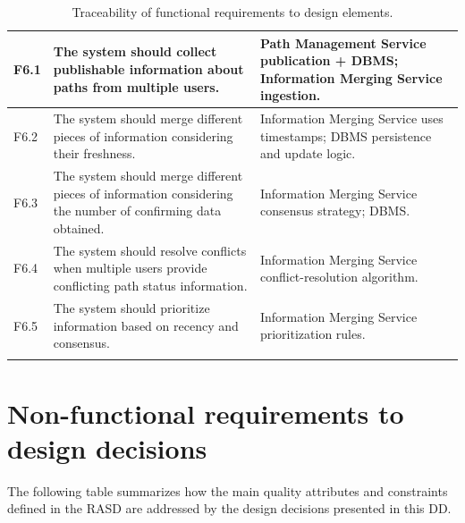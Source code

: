 \begin{longtable}{|p{}|p{}|p{}|}
    F6.1 & The system should collect publishable information about paths from multiple users. &
    Path Management Service publication + DBMS; Information Merging Service ingestion. \\
    \hline
    F6.2 & The system should merge different pieces of information considering their freshness. &
    Information Merging Service uses timestamps; DBMS persistence and update logic. \\
    \hline
    F6.3 & The system should merge different pieces of information considering the number of confirming data obtained. &
    Information Merging Service consensus strategy; DBMS. \\
    \hline
    F6.4 & The system should resolve conflicts when multiple users provide conflicting path status information. &
    Information Merging Service conflict-resolution algorithm. \\
    \hline
    F6.5 & The system should prioritize information based on recency and consensus. &
    Information Merging Service prioritization rules. \\
    \hline
    \caption{Traceability of functional requirements to design elements.}
    \label{tab:fr_traceability}
\end{longtable}
\normalsize

\section{Non-functional requirements to design decisions}
\label{sec:nfr_to_design}%

The following table summarizes how the main quality attributes and constraints defined in the RASD are addressed by the design decisions presented in this DD.

